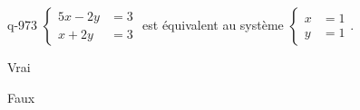 \begin{truefalse}{q-973}
$\begin{cases}5x-2y &= 3 \\ x+2y &= 3\end{cases}$ est équivalent au système $\begin{cases}x&=1 \\ y&=1\end{cases}$.
\item* Vrai
\item Faux
\end{truefalse}

